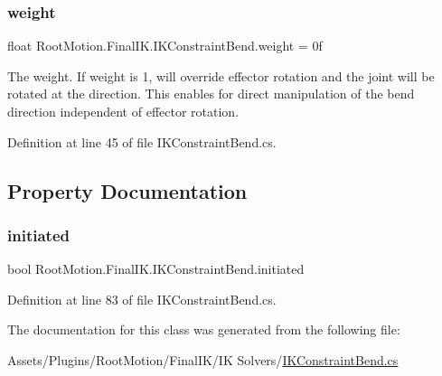 \subsubsection{\texorpdfstring{weight}{weight}}
{\footnotesize\ttfamily float Root\+Motion.\+Final\+I\+K.\+I\+K\+Constraint\+Bend.\+weight = 0f}



The weight. If weight is 1, will override effector rotation and the joint will be rotated at the direction. This enables for direct manipulation of the bend direction independent of effector rotation. 



Definition at line 45 of file I\+K\+Constraint\+Bend.\+cs.



\subsection{Property Documentation}
\mbox{\label{class_root_motion_1_1_final_i_k_1_1_i_k_constraint_bend_aad912f433527d08025513c66a2bafce7}} 
\subsubsection{\texorpdfstring{initiated}{initiated}}
{\footnotesize\ttfamily bool Root\+Motion.\+Final\+I\+K.\+I\+K\+Constraint\+Bend.\+initiated\hspace{0.3cm}{\ttfamily [get]}}



Definition at line 83 of file I\+K\+Constraint\+Bend.\+cs.



The documentation for this class was generated from the following file\+:\begin{DoxyCompactItemize}
\item 
Assets/\+Plugins/\+Root\+Motion/\+Final\+I\+K/\+I\+K Solvers/\mbox{\hyperlink{_i_k_constraint_bend_8cs}{I\+K\+Constraint\+Bend.\+cs}}\end{DoxyCompactItemize}
